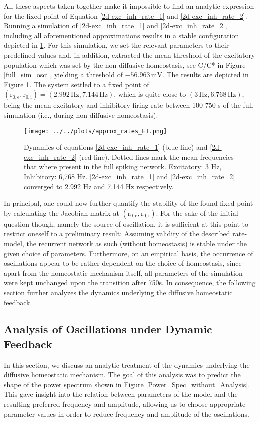 \documentclass[10pt,a4paper]{article}
\begin{document}
All these aspects taken together make it impossible to find an analytic expression for the fixed point of Equation \ref{2d-exc_inh_rate_1} and \ref{2d-exc_inh_rate_2}. Running a simulation of \ref{2d-exc_inh_rate_1} and \ref{2d-exc_inh_rate_2}, including all aforementioned approximations results in a stable configuration depicted in \ref{Dyn_Rate_Approx}. For this simulation, we set the relevant parameters to their predefined values and, in addition, extracted the mean threshold of the excitatory population which was set by the non-diffusive homeostasis, see C/C* in Figure \ref{full_sim_osci}, yielding a threshold of $\mathrm{-56.963\, mV}$. The results are depicted in Figure \ref{Dyn_Rate_Approx}. The system settled to a fixed point of $\mathrm{(r_{0,e},r_{0,i}) = (2.992\, Hz, 7.144\, Hz)}$, which is quite close to $\mathrm{(3\, Hz, 6.768\, Hz)}$, being the mean excitatory and inhibitory firing rate between 100-750 s of the full simulation (i.e., during non-diffusive homeostasis).
\begin{figure}
\begin{center}
\texttt{[image: ../../plots/approx\_rates\_EI.png]}
\end{center}
\caption{Dynamics of equations \ref{2d-exc_inh_rate_1} (blue line) and \ref{2d-exc_inh_rate_2} (red line). Dotted lines mark the mean frequencies that where present in the full spiking network. Excitatory: 3 Hz, Inhibitory: 6,768 Hz. \ref{2d-exc_inh_rate_1} and \ref{2d-exc_inh_rate_2} converged to 2.992 Hz and 7.144 Hz respectively.}
\label{Dyn_Rate_Approx}
\end{figure}
In principal, one could now further quantify the stability of the found fixed point by calculating the Jacobian matrix at $\mathrm{(r_{0,e},r_{0,i})}$. For the sake of the initial question though, namely the source of oscillation, it is sufficient at this point to restrict oneself to a preliminary result: Assuming validity of the described rate-model, the recurrent network as such (without homeostasis) is stable under the given choice of parameters. Furthermore, on an empirical basis, the occurrence of oscillations appear to be rather dependent on the choice of homeostasis, since apart from the homeostatic mechanism itself, all parameters of the simulation were kept unchanged upon the transition after 750s. In consequence, the following section further analyzes the dynamics underlying the diffusive homeostatic feedback.

\subsection{Analysis of Oscillations under Dynamic Feedback}\label{theor_osc}
In this section, we discuss an analytic treatment of the dynamics underlying the diffusive homeostatic mechanism. The goal of this analysis was to predict the shape of the power spectrum shown in Figure \ref{Power_Spec_without_Analysis}. This gave insight into the relation between parameters of the model and the resulting preferred frequency and amplitude, allowing us to choose appropriate parameter values in order to reduce frequency and amplitude of the oscillations.
\end{document}
